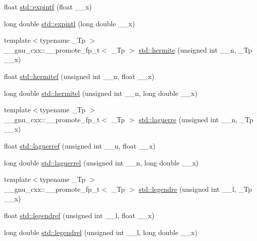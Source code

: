 \begin{DoxyCompactItemize}
\item 
float \hyperlink{group__tr29124__math__spec__func_ga5842816f6eed2594e0a327df4e4a2a47}{std\+::expintf} (float \+\_\+\+\_\+x)
\item 
long double \hyperlink{group__tr29124__math__spec__func_ga1329130b32328d0666e290ee5931fa4f}{std\+::expintl} (long double \+\_\+\+\_\+x)
\item 
{\footnotesize template$<$typename \+\_\+\+Tp $>$ }\\\+\_\+\+\_\+gnu\+\_\+cxx\+::\+\_\+\+\_\+promote\+\_\+fp\+\_\+t$<$ \+\_\+\+Tp $>$ \hyperlink{group__tr29124__math__spec__func_gaded38c372f2977d30b613bd55426f132}{std\+::hermite} (unsigned int \+\_\+\+\_\+n, \+\_\+\+Tp \+\_\+\+\_\+x)
\item 
float \hyperlink{group__tr29124__math__spec__func_ga94dae7444bb349e33057a92932db8abe}{std\+::hermitef} (unsigned int \+\_\+\+\_\+n, float \+\_\+\+\_\+x)
\item 
long double \hyperlink{group__tr29124__math__spec__func_ga21f8e312ee3e65286f86bf141b0f32e0}{std\+::hermitel} (unsigned int \+\_\+\+\_\+n, long double \+\_\+\+\_\+x)
\item 
{\footnotesize template$<$typename \+\_\+\+Tp $>$ }\\\+\_\+\+\_\+gnu\+\_\+cxx\+::\+\_\+\+\_\+promote\+\_\+fp\+\_\+t$<$ \+\_\+\+Tp $>$ \hyperlink{group__tr29124__math__spec__func_gaf1927ca6432351e3a7af47e158e63862}{std\+::laguerre} (unsigned int \+\_\+\+\_\+n, \+\_\+\+Tp \+\_\+\+\_\+x)
\item 
float \hyperlink{group__tr29124__math__spec__func_gada763419b0e21b38e38daa8b6eb56a8c}{std\+::laguerref} (unsigned int \+\_\+\+\_\+n, float \+\_\+\+\_\+x)
\item 
long double \hyperlink{group__tr29124__math__spec__func_gaaf8b141edf9163b37ea4f2ed3e0191fc}{std\+::laguerrel} (unsigned int \+\_\+\+\_\+n, long double \+\_\+\+\_\+x)
\item 
{\footnotesize template$<$typename \+\_\+\+Tp $>$ }\\\+\_\+\+\_\+gnu\+\_\+cxx\+::\+\_\+\+\_\+promote\+\_\+fp\+\_\+t$<$ \+\_\+\+Tp $>$ \hyperlink{group__tr29124__math__spec__func_ga327bb7686d2e63d85e8c6b1b42b3b29e}{std\+::legendre} (unsigned int \+\_\+\+\_\+l, \+\_\+\+Tp \+\_\+\+\_\+x)
\item 
float \hyperlink{group__tr29124__math__spec__func_gaed94e3c664c99f5204da75be75aeac21}{std\+::legendref} (unsigned int \+\_\+\+\_\+l, float \+\_\+\+\_\+x)
\item 
long double \hyperlink{group__tr29124__math__spec__func_ga1b39bc22e3cc4860d08eb54099460391}{std\+::legendrel} (unsigned int \+\_\+\+\_\+l, long double \+\_\+\+\_\+x)

\end{DoxyCompactItemize}

